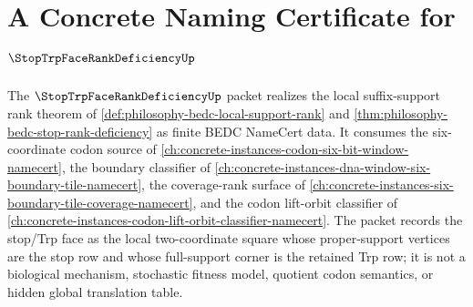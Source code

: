 \chapter{A Concrete Naming Certificate for $\StopTrpFaceRankDeficiencyUp$}
\label{ch:concrete-instances-stop-trp-face-rank-deficiency-namecert}

The $\StopTrpFaceRankDeficiencyUp$ packet realizes the local suffix-support
rank theorem of \autoref{def:philosophy-bedc-local-support-rank} and
\autoref{thm:philosophy-bedc-stop-rank-deficiency} as finite BEDC NameCert
data. It consumes the six-coordinate codon source of
\autoref{ch:concrete-instances-codon-six-bit-window-namecert}, the boundary
classifier of \autoref{ch:concrete-instances-dna-window-six-boundary-tile-namecert},
the coverage-rank surface of
\autoref{ch:concrete-instances-six-boundary-tile-coverage-namecert}, and the
codon lift-orbit classifier of
\autoref{ch:concrete-instances-codon-lift-orbit-classifier-namecert}. The
packet records the stop/Trp face as the local two-coordinate square whose
proper-support vertices are the stop row and whose full-support corner is the
retained Trp row; it is not a biological mechanism, stochastic fitness model,
quotient codon semantics, or hidden global translation table.

